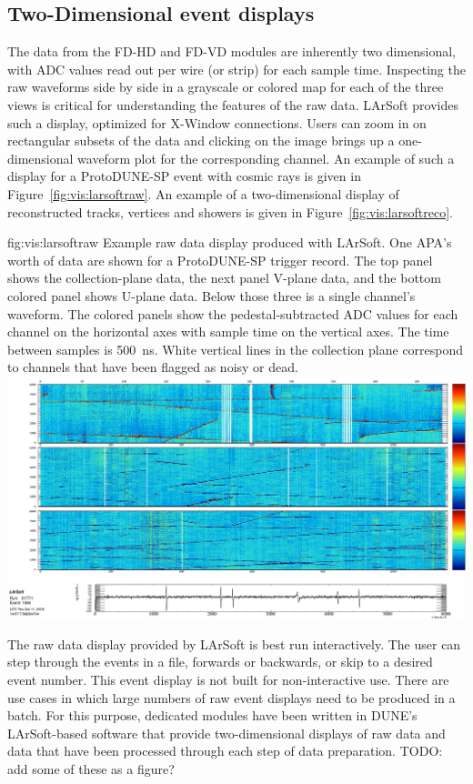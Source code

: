 \documentclass[../main-v1.tex]{subfiles}
\begin{document}
\subsection{Two-Dimensional event displays}
\label{sec:visualization:2d}

The data from the FD-HD and FD-VD modules are inherently two dimensional, with ADC values read out per wire (or strip) for each sample time.  Inspecting the raw waveforms side by side in a grayscale or colored map for each of the three views is critical for understanding the features of the raw data.  LArSoft provides such a display, optimized for X-Window connections.  Users can zoom in on rectangular subsets of the data and clicking on the image brings up a one-dimensional waveform plot for the corresponding channel.  An example of such a display for a ProtoDUNE-SP event with cosmic rays is given in Figure~\ref{fig:vis:larsoftraw}.  An example of a two-dimensional display of reconstructed tracks, vertices and showers is given in Figure~\ref{fig:vis:larsoftreco}.  

\begin{dunefigure}
{fig:vis:larsoftraw} 
{Example raw data display produced with LArSoft.  One APA's worth of data are shown for a ProtoDUNE-SP trigger record. The top panel shows the collection-plane data, the next panel V-plane data, and the bottom colored panel shows U-plane data.  Below those three is a single channel's waveform.  The colored panels show the pedestal-subtracted ADC values for each channel on the horizontal axes with sample time on the vertical axes.  The time between samples is 500~ns.  White vertical lines in the collection plane correspond to channels that have been flagged as noisy or dead.}
\includegraphics[width=0.9 \textwidth]{graphics/EventDisplays/pdsp_larsoft_rawevent.png}
\end{dunefigure}

The raw data display provided by LArSoft is best run interactively.  The user can step through the events in a file, forwards or backwards, or skip to a desired event number.  This event display is not built for non-interactive use.  There are use cases in which large numbers of raw event displays need to be produced in a batch.  For this purpose, dedicated modules have been written in DUNE's LArSoft-based software that provide two-dimensional displays of raw data and data that have been processed through each step of data preparation.  {\color{red} TODO:  add some of these as a figure?}
\end{document}
